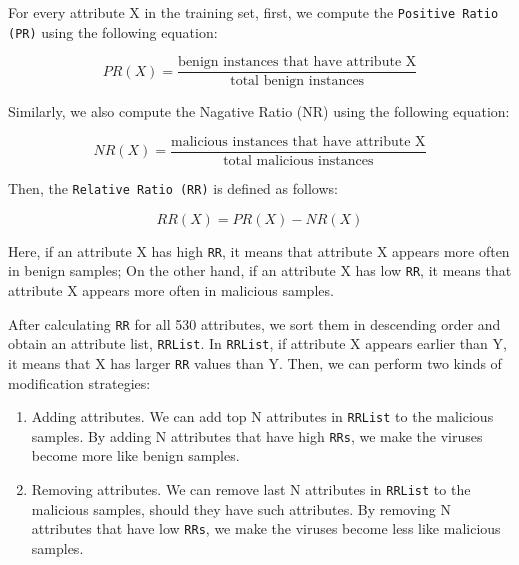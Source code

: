\documentclass[11pt]{article}
\begin{document}
For every attribute X in the training set, first, we compute the \texttt{Positive Ratio (PR)} using the following equation:

\begin{equation}
PR(X) = \frac{\text{benign instances that have attribute X}}{\text{total benign instances}}
\end{equation}

Similarly, we also compute the Nagative Ratio (NR) using the following equation:

\begin{equation}
NR(X) = \frac{\text{malicious instances that have attribute X}}{\text{total malicious instances}}
\end{equation}

Then, the \texttt{Relative Ratio (RR)} is defined as follows:

\begin{equation}
RR(X) = PR(X) - NR(X)
\end{equation}

Here, if an attribute X has high \texttt{RR}, it means that attribute X appears more often in benign samples; On the other hand, if an attribute X has low \texttt{RR}, it means that attribute X appears more often in malicious samples.

After calculating \texttt{RR} for all 530 attributes, we sort them in descending order and obtain an attribute list, \texttt{RRList}. In \texttt{RRList}, if attribute X appears earlier than Y, it means that X has larger \texttt{RR} values than Y. Then, we can perform two kinds of modification strategies:
\begin{enumerate}
\item {Adding attributes.} 
We can add top N attributes in \texttt{RRList} to the malicious samples. By adding N attributes that have high \texttt{RRs}, we make the viruses become more like benign samples.
\item {Removing attributes.}
We can remove last N attributes in \texttt{RRList} to the malicious samples, should they have such attributes. By removing N attributes that have low \texttt{RRs}, we make the viruses become less like malicious samples.
\end{enumerate}

\end{document}
